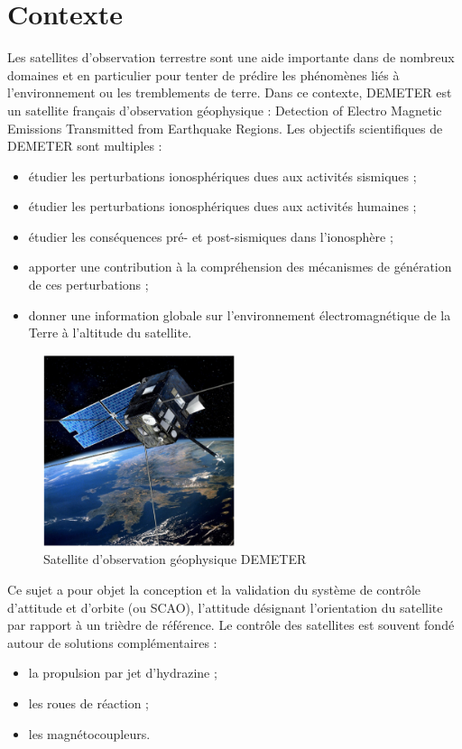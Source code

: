 \section*{Contexte}\label{contexte}

\ifprof
\else
Les satellites d'observation terrestre sont une aide importante dans de nombreux domaines et en particulier pour tenter de prédire les
phénomènes liés à l'environnement ou les tremblements de terre. Dans ce contexte, DEMETER est un satellite français d'observation géophysique :
Detection of Electro Magnetic Emissions Transmitted from Earthquake Regions. Les objectifs scientifiques de DEMETER sont multiples :
\begin{itemize}
\item étudier les perturbations ionosphériques dues aux activités sismiques ;
\item étudier les perturbations ionosphériques dues aux activités humaines ;
\item étudier les conséquences pré- et post-sismiques dans l'ionosphère ;
\item apporter une contribution à la compréhension des mécanismes de génération de ces perturbations ;
\item donner une information globale sur l'environnement électromagnétique de la Terre à l'altitude du satellite.
\end{itemize}

\begin{figure}[!htb]
\begin{center}
\includegraphics[width=0.5\textwidth]{images/images1.jpg}
\caption{Satellite d'observation géophysique DEMETER \label{fig1}}
\end{center}
\end{figure}



Ce sujet a pour objet la conception et la validation du système de contrôle d'attitude et d'orbite (ou SCAO), l'attitude désignant
l'orientation du satellite par rapport à un trièdre de référence. Le contrôle des satellites est souvent fondé autour de solutions
complémentaires :
\begin{itemize}
\item la propulsion par jet d'hydrazine ;  
\item les roues de réaction ;
\item les magnétocoupleurs.  
\end{itemize}


